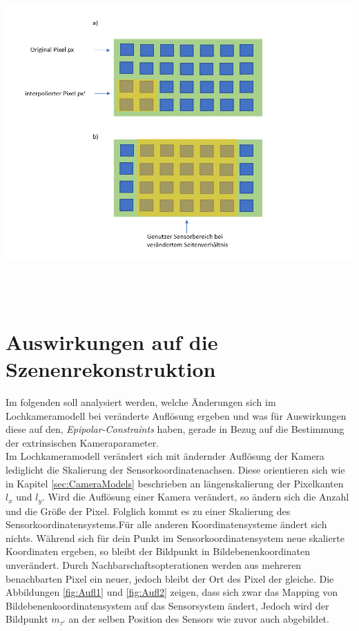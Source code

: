 \begin{minipage}{\linewidth}
	\centering
	\includegraphics[width=1.\linewidth]{images/AufloesungSensor.png}
	\label{fig:SensorResolutions}
\end{minipage}\\ \\

\section{Auswirkungen auf die Szenenrekonstruktion}

Im folgenden soll analysiert werden, welche Änderungen sich im Lochkameramodell bei veränderte Auflösung ergeben und was für Auswirkungen diese auf den,  \textit{Epipolar-Constraints} haben, gerade in Bezug auf die Bestimmung der extrinsischen Kameraparameter.\\

Im Lochkameramodell verändert sich mit ändernder Auflösung der Kamera lediglicht die Skalierung der Sensorkoordinatenachsen. Diese orientieren sich wie in Kapitel \ref{sec:CameraModels} beschrieben an längenskalierung der Pixelkanten $l_x$ und $l_y$. Wird die Auflösung einer Kamera verändert, so ändern sich die Anzahl und die Größe der Pixel. Folglich kommt es zu einer Skalierung des Sensorkoordinatensystems.Für alle anderen Koordinatensysteme ändert sich nichts. Während sich für dein Punkt im Sensorkoordinatensystem neue skalierte Koordinaten ergeben, so bleibt der Bildpunkt in Bildebenenkoordinaten unverändert. Durch Nachbarschaftsopterationen werden aus mehreren benachbarten Pixel ein neuer, jedoch bleibt der Ort des Pixel der gleiche\cite{Doessel}.
Die Abbildungen \ref{fig:Aufl1} und \ref{fig:Aufl2} zeigen, dass sich zwar das Mapping von Bildebenenkoordinatensystem auf das Sensorsystem ändert, Jedoch wird der Bildpunkt $m_{\tau'}$ an der selben Position des Sensors wie zuvor auch abgebildet.\\


